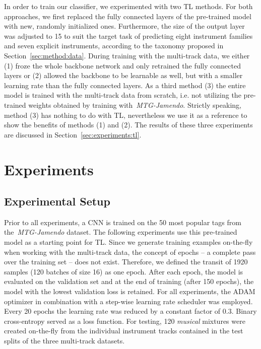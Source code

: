 \documentclass{article}
\begin{document}
In order to train our classifier, we experimented with two TL methods. For both approaches, we first replaced the fully connected layers of the pre-trained model with new, randomly initialized ones. Furthermore, the size of the output layer was adjusted to 15 to suit the target task of predicting eight instrument families and seven explicit instruments, according to the taxonomy proposed in Section~\ref{sec:method:data}. During training with the multi-track data, we either (1) froze the whole backbone network and only retrained the fully connected layers or (2) allowed the backbone to be learnable as well, but with a smaller learning rate than the fully connected layers. As a third method (3) the entire model is trained with the multi-track data from scratch, i.e. not utilizing the pre-trained weights obtained by training with~\textit{MTG-Jamendo}. Strictly speaking, method (3) has nothing to do with TL, nevertheless we use it as a reference to show the benefits of methods (1) and (2). The results of these three experiments are discussed in Section~\ref{sec:experiments:tl}.


\section{Experiments}
\label{sec:experiments}

\subsection{Experimental Setup}
\label{sec:experiments:setup}
Prior to all experiments, a CNN is trained on the 50 most popular tags from the~\textit{MTG-Jamendo} dataset. The following experiments use this pre-trained model as a starting point for TL. Since we generate training examples on-the-fly when working with the multi-track data, the concept of epochs -- a complete pass over the training set -- does not exist. Therefore, we defined the transit of 1920 samples (120 batches of size 16) as one epoch. After each epoch, the model is evaluated on the validation set and at the end of training (after 150 epochs), the model with the lowest validation loss is retained. For all experiments, the ADAM optimizer in combination with a step-wise learning rate scheduler was employed. Every 20 epochs the learning rate was reduced by a constant factor of $0.3$. Binary cross-entropy served as a loss function. For testing, 120 \textit{musical} mixtures were created on-the-fly from the individual instrument tracks contained in the test splits of the three multi-track datasets. %
\end{document}
